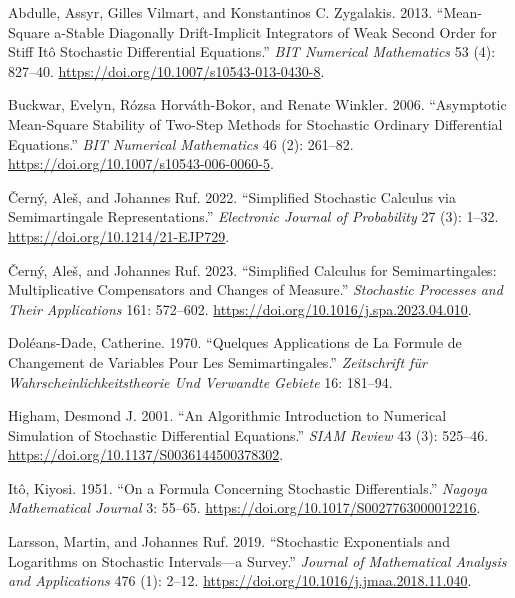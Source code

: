 \documentclass[
  english,
  10pt,
  letterpaper,
  DIV=11,
  numbers=noendperiod]{scrartcl}
\newlength{\cslhangindent}
\newenvironment{CSLReferences}[2] %
 {\begin{list}{}{%
  \setlength{\itemindent}{0pt}
  \setlength{\leftmargin}{0pt}
  \setlength{\parsep}{0pt}
  \ifodd #1
   \setlength{\leftmargin}{\cslhangindent}
   \setlength{\itemindent}{-1\cslhangindent}
  \fi
  \setlength{\itemsep}{#2\baselineskip}}}
 {\end{list}}
\begin{document}
\protect{}\label{refs}
\begin{CSLReferences}{1}{1}
Abdulle, Assyr, Gilles Vilmart, and Konstantinos C. Zygalakis. 2013.
{``Mean-Square a-Stable Diagonally Drift-Implicit Integrators of Weak
Second Order for Stiff {It{ô}} Stochastic Differential Equations.''}
\emph{BIT Numerical Mathematics} 53 (4): 827--40.
\url{https://doi.org/10.1007/s10543-013-0430-8}.

Buckwar, Evelyn, Rózsa Horváth-Bokor, and Renate Winkler. 2006.
{``Asymptotic Mean-Square Stability of Two-Step Methods for Stochastic
Ordinary Differential Equations.''} \emph{BIT Numerical Mathematics} 46
(2): 261--82. \url{https://doi.org/10.1007/s10543-006-0060-5}.

Černý, Aleš, and Johannes Ruf. 2022. {``Simplified Stochastic Calculus
via Semimartingale Representations.''} \emph{Electronic Journal of
Probability} 27 (3): 1--32. \url{https://doi.org/10.1214/21-EJP729}.

Černý, Aleš, and Johannes Ruf. 2023. {``Simplified Calculus for
Semimartingales: Multiplicative Compensators and Changes of Measure.''}
\emph{Stochastic Processes and Their Applications} 161: 572--602.
\url{https://doi.org/10.1016/j.spa.2023.04.010}.

Doléans-Dade, Catherine. 1970. {``Quelques Applications de La Formule de
Changement de Variables Pour Les Semimartingales.''} \emph{Zeitschrift
f{ü}r Wahrscheinlichkeitstheorie Und Verwandte Gebiete} 16: 181--94.

Higham, Desmond J. 2001. {``An Algorithmic Introduction to Numerical
Simulation of Stochastic Differential Equations.''} \emph{SIAM Review}
43 (3): 525--46. \url{https://doi.org/10.1137/S0036144500378302}.

Itô, Kiyosi. 1951. {``On a Formula Concerning Stochastic
Differentials.''} \emph{Nagoya Mathematical Journal} 3: 55--65.
\url{https://doi.org/10.1017/S0027763000012216}.

Larsson, Martin, and Johannes Ruf. 2019. {``Stochastic Exponentials and
Logarithms on Stochastic Intervals---a Survey.''} \emph{Journal of
Mathematical Analysis and Applications} 476 (1): 2--12.
\url{https://doi.org/10.1016/j.jmaa.2018.11.040}.


\end{CSLReferences}
\end{document}
